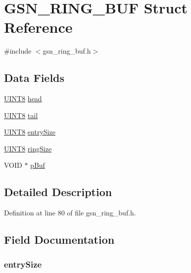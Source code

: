 \hypertarget{a00191}{
\section{GSN\_\-RING\_\-BUF Struct Reference}
\label{a00191}
}


{\ttfamily \#include $<$gsn\_\-ring\_\-buf.h$>$}

\subsection*{Data Fields}
\begin{DoxyCompactItemize}
\item 
\hyperlink{a00660_gab27e9918b538ce9d8ca692479b375b6a}{UINT8} \hyperlink{a00191_ac088e3c86166df13e486e4f6d0b38007}{head}
\item 
\hyperlink{a00660_gab27e9918b538ce9d8ca692479b375b6a}{UINT8} \hyperlink{a00191_ad1a0b175200ea5b01916f62e03994351}{tail}
\item 
\hyperlink{a00660_gab27e9918b538ce9d8ca692479b375b6a}{UINT8} \hyperlink{a00191_aa876c5eed3a57ff71ab32fd8f44b73ff}{entrySize}
\item 
\hyperlink{a00660_gab27e9918b538ce9d8ca692479b375b6a}{UINT8} \hyperlink{a00191_ac903388e3f5809147f72582e4d6d2a85}{ringSize}
\item 
VOID $\ast$ \hyperlink{a00191_ae73880d96d570d584a107c2b4ef84584}{pBuf}
\end{DoxyCompactItemize}


\subsection{Detailed Description}


Definition at line 80 of file gsn\_\-ring\_\-buf.h.



\subsection{Field Documentation}
\hypertarget{a00191_aa876c5eed3a57ff71ab32fd8f44b73ff}{
\subsubsection[{entrySize}]{ {\bf entrySize}}}
\label{a00191_aa876c5eed3a57ff71ab32fd8f44b73ff}


